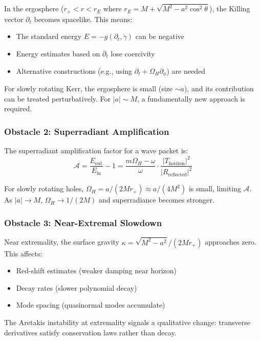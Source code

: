 \documentclass[12pt,a4paper]{article}
\begin{document}
In the ergosphere ($r_+ < r < r_E$ where $r_E = M + \sqrt{M^2 - a^2\cos^2\theta}$), the Killing vector $\partial_t$ becomes spacelike. This means:
\begin{itemize}
    \item The standard energy $E = -g(\partial_t, \dot{\gamma})$ can be negative
    \item Energy estimates based on $\partial_t$ lose coercivity
    \item Alternative constructions (e.g., using $\partial_t + \Omega_H \partial_\phi$) are needed
\end{itemize}

For slowly rotating Kerr, the ergosphere is small (size $\sim a$), and its contribution can be treated perturbatively. For $|a| \sim M$, a fundamentally new approach is required.

\subsubsection{Obstacle 2: Superradiant Amplification}

The superradiant amplification factor for a wave packet is:
\begin{equation}
\mathcal{A} = \frac{E_{\text{out}}}{E_{\text{in}}} - 1 = \frac{m\Omega_H - \omega}{\omega} \cdot \frac{|T_{\text{horizon}}|^2}{|R_{\text{reflected}}|^2}
\end{equation}

For slowly rotating holes, $\Omega_H = a/(2Mr_+) \approx a/(4M^2)$ is small, limiting $\mathcal{A}$. As $|a| \to M$, $\Omega_H \to 1/(2M)$ and superradiance becomes stronger.

\subsubsection{Obstacle 3: Near-Extremal Slowdown}

Near extremality, the surface gravity $\kappa = \sqrt{M^2 - a^2}/(2Mr_+)$ approaches zero. This affects:
\begin{itemize}
    \item Red-shift estimates (weaker damping near horizon)
    \item Decay rates (slower polynomial decay)
    \item Mode spacing (quasinormal modes accumulate)
\end{itemize}

The Aretakis instability at extremality signals a qualitative change: transverse derivatives satisfy conservation laws rather than decay.
\end{document}
